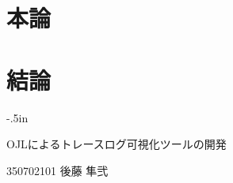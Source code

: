 \documentclass[a4paper,12pt]{jreport}
\begin{document}
\chapter{本論}

\chapter{結論}

\clearpage

\thispagestyle{empty}
\oddsidemargin -4in
\evensidemargin -4in
\topmargin -.5in
{
\tate
\Large\sffamily\gtfamily
\begin{minipage}{9.5in}
\begin{minipage}{6.0in}
OJLによるトレースログ可視化ツールの開発
\end{minipage}
\hfill\hfill\hfill\hfill
350702101
\hfill
後藤 隼弐
\end{minipage}
}
\end{document}
